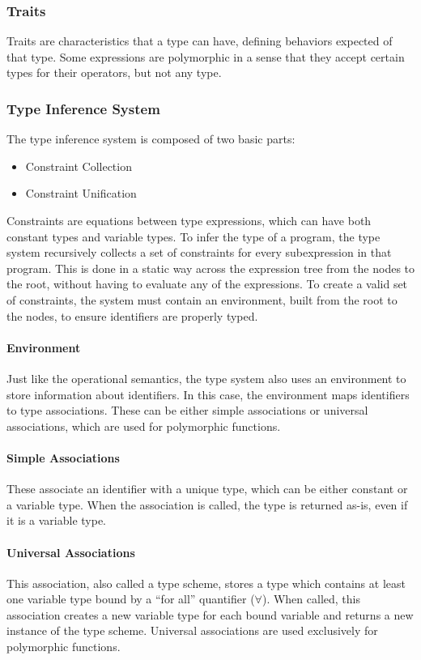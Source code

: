 \documentclass{article}
\begin{document}
\subsubsection{Traits}

Traits are characteristics that a type can have, defining behaviors expected of that type.
Some expressions are polymorphic in a sense that they accept certain types for their operators, but not any type.

\subsubsection{Type Inference System}

The type inference system is composed of two basic parts:
\begin{itemize}
  \item Constraint Collection
  \item Constraint Unification
\end{itemize}

Constraints are equations between type expressions, which can have both constant types and variable types.
To infer the type of a program, the type system recursively collects a set of constraints for every subexpression in that program.
This is done in a static way across the expression tree from the nodes to the root, without having to evaluate any of the expressions.
To create a valid set of constraints, the system must contain an environment, built from the root to the nodes, to ensure identifiers are properly typed.

\paragraph{Environment}
Just like the operational semantics, the type system also uses an environment to store information about identifiers.
In this case, the environment maps identifiers to type associations.
These can be either simple associations or universal associations, which are used for polymorphic functions.

\paragraph{Simple Associations}
These associate an identifier with a unique type, which can be either constant or a variable type.
When the association is called, the type is returned as-is, even if it is a variable type.

\paragraph{Universal Associations}
This association, also called a type scheme, stores a type which contains at least one variable type bound by a ``for all'' quantifier ($\forall$).
When called, this association creates a new variable type for each bound variable and returns a new instance of the type scheme.
Universal associations are used exclusively for polymorphic functions.
\end{document}
